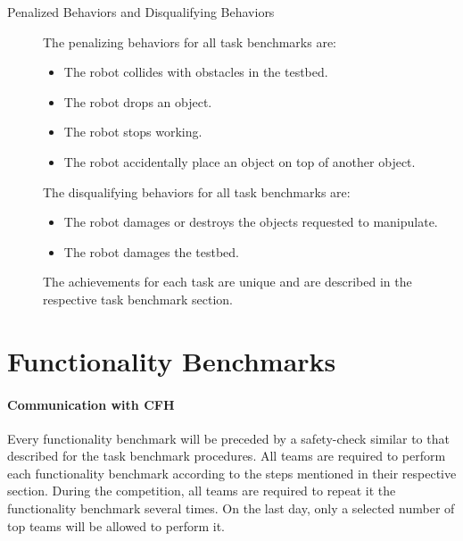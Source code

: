 \begin{description}
\item[Penalized Behaviors and Disqualifying Behaviors]
The penalizing behaviors for all task benchmarks are:
\begin{itemize}
\item The robot collides with obstacles in the testbed.
\item The robot drops an object.
\item The robot stops working.
\item The robot accidentally place an object on top of another object.
\end{itemize}
The disqualifying behaviors for all task benchmarks are:
\begin{itemize}
\item The robot damages or destroys the objects requested to manipulate.
\item The robot damages the testbed.
\end{itemize}
The achievements for each task are unique and are described in the respective task benchmark section.

\end{description}

%
%

%


\clearpage
\section{Functionality Benchmarks}
\label{sec:FunctionalityBenchmarks}

\paragraph{Communication with CFH}
\label{ssec:CommCFH}
Every functionality benchmark will be preceded by a safety-check similar to that described for the task benchmark procedures.
All teams are required to perform each functionality benchmark according to the steps mentioned in their respective section. During the competition, all teams are required to repeat it the functionality benchmark several times. On the last day, only a selected number of top teams will be allowed to perform it.





%


%

